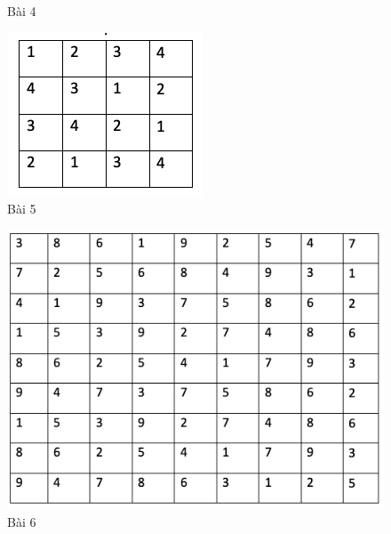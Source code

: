 \begin{multicols}{2}
\begin{figure}[H]
		\caption{\small{Bài 4}}
		\vspace*{-10pt}
	\end{figure}
	\begin{figure}[H]
		\centering
		\vspace*{-5pt}
		\captionsetup{labelformat= empty, justification=centering}
		\includegraphics[width=0.9\linewidth]{sudoku5}
		\caption{\small{Bài 5}}
		\vspace*{-10pt}
	\end{figure}
	\begin{figure}[H]
		\centering
		\vspace*{-5pt}
		\captionsetup{labelformat= empty, justification=centering}
		\includegraphics[width=0.9\linewidth]{sudoku6}
		\caption{\small{Bài 6}}
		\vspace*{-10pt}
	\end{figure}
\end{multicols}
